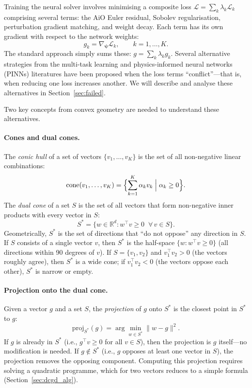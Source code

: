 \documentclass[11pt,a4paper]{article}
\theoremstyle{definition}
\newcommand{\R}{\mathbb{R}}
\newcommand{\bpsi}{\boldsymbol{\psi}}
\begin{document}
	Training the neural solver involves minimising a composite loss $\mathcal{L} = \sum_k \lambda_k \mathcal{L}_k$ comprising several terms: the AiO Euler residual, Sobolev regularisation, perturbation gradient matching, and weight decay.
	Each term has its own gradient with respect to the network weights:
	\begin{equation}
		g_k = \nabla_{\bpsi} \mathcal{L}_k, \qquad k = 1, \ldots, K.
	\end{equation}
	The standard approach simply sums these: $g = \sum_k \lambda_k g_k$.
	Several alternative strategies from the multi-task learning and physics-informed neural networks (PINNs) literatures have been proposed when the loss terms ``conflict''---that is, when reducing one loss increases another.
	We will describe and analyse these alternatives in Section~\ref{sec:failed}.
	
	Two key concepts from convex geometry are needed to understand these alternatives.
	
	\paragraph{Cones and dual cones.}
	The \emph{conic hull} of a set of vectors $\{v_1, \ldots, v_K\}$ is the set of all non-negative linear combinations:
	\begin{equation}
		\mathrm{cone}(v_1, \ldots, v_K) = \Bigl\{\sum_{k=1}^K \alpha_k v_k \;\Big|\; \alpha_k \geq 0\Bigr\}.
	\end{equation}
	The \emph{dual cone} of a set $S$ is the set of all vectors that form non-negative inner products with every vector in $S$:
	\begin{equation}\label{eq:dual_cone_def}
		S^* = \{w \in \R^d : w^\top v \geq 0 \;\;\forall\, v \in S\}.
	\end{equation}
	Geometrically, $S^*$ is the set of directions that ``do not oppose'' any direction in $S$.
	If $S$ consists of a single vector $v$, then $S^*$ is the half-space $\{w : w^\top v \geq 0\}$ (all directions within 90 degrees of $v$).
	If $S = \{v_1, v_2\}$ and $v_1^\top v_2 > 0$ (the vectors roughly agree), then $S^*$ is a wide cone; if $v_1^\top v_2 < 0$ (the vectors oppose each other), $S^*$ is narrow or empty.
	
	\paragraph{Projection onto the dual cone.}
	Given a vector $g$ and a set $S$, the \emph{projection} of $g$ onto $S^*$ is the closest point in $S^*$ to $g$:
	\begin{equation}
		\mathrm{proj}_{S^*}(g) = \arg\min_{w \in S^*} \|w - g\|^2.
	\end{equation}
	If $g$ is already in $S^*$ (i.e., $g^\top v \geq 0$ for all $v \in S$), then the projection is $g$ itself---no modification is needed.
	If $g \notin S^*$ (i.e., $g$ opposes at least one vector in $S$), the projection removes the opposing component.
	Computing this projection requires solving a quadratic programme, which for two vectors reduces to a simple formula (Section~\ref{sec:dcgd_alg}).
	
\end{document}
